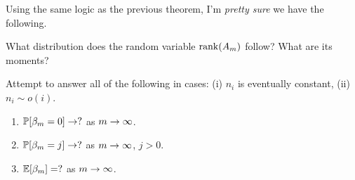 Using the same logic as the previous theorem, I'm {\em pretty sure} we have
the following.



\begin{question} What distribution does the random variable
  $\operatorname{\mathrm{rank}}(A_m)$ follow? What are its moments?
\end{question}

\begin{conjecture}
  Attempt to answer all of the following in cases:
  (i) $n_i$ is eventually constant, (ii) $n_i \sim o(i)$.
  \begin{enumerate}
    \item $\mathbb{P}[\beta_m = 0] \rightarrow ?$ as $m \rightarrow \infty$.
    \item $\mathbb{P}[\beta_m = j] \rightarrow ?$ as $m \rightarrow \infty$, $j>0$.
    \item $\mathbb{E}[\beta_m] = ?$ as $m \rightarrow \infty$.
  \end{enumerate}
\end{conjecture}

